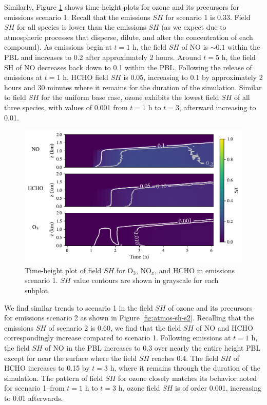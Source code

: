Similarly, Figure \ref{fig:atmos-sh-s1} shows time-height plots for ozone and its precursors for emissions scenario 1. Recall that the emissions $SH$ for scenario 1 is 0.33. Field $SH$ for all species is lower than the emissions $SH$ (as we expect due to atmospheric processes that disperse, dilute, and alter the concentration of each compound). As emissions begin at $t=1$ h, the field $SH$ of NO is $\sim0.1$ within the PBL and increases to 0.2 after approximately 2 hours. Around $t=5$ h, the field SH of NO decreases back down to 0.1 within the PBL. Following the release of emissions at $t=1$ h, HCHO field $SH$ is 0.05, increasing to 0.1 by approximately 2 hours and 30 minutes where it remains for the duration of the simulation. Similar to field $SH$ for the uniform base case, ozone exhibits the lowest field $SH$ of all three species, with values of 0.001 from $t=1$ h to $t=3$, afterward increasing to 0.01.

\begin{figure}[h]
    \centering
    \includegraphics[width=.97\textwidth]{figures/chapter4/height-time-nsh-multivar-fx1fy0.pdf}
    \caption{Time-height plot of field $SH$ for O$_3$, NO$_x$, and HCHO in emissions scenario 1. $SH$ value contours are shown in grayscale for each subplot.}
    \label{fig:atmos-sh-s1}
 \end{figure}
 
We find similar trends to scenario 1 in the field $SH$ of ozone and its precursors for emissions scenario 2 as shown in Figure \ref{fig:atmos-sh-s2}. Recalling that the emissions $SH$ of scenario 2 is 0.60, we find that the field $SH$ of NO and HCHO correspondingly increase compared to scenario 1. Following emissions at $t=1$ h, the field $SH$ of NO in the PBL increases to 0.3 over nearly the entire height PBL except for near the surface where the field $SH$ reaches 0.4. The field $SH$ of HCHO increases to 0.15 by $t=3$ h, where it remains through the duration of the simulation. The pattern of field $SH$ for ozone closely matches its behavior noted for scenario 1--from $t=1$ h to $t=3$ h, ozone field $SH$ is of order 0.001, increasing to 0.01 afterwards.

